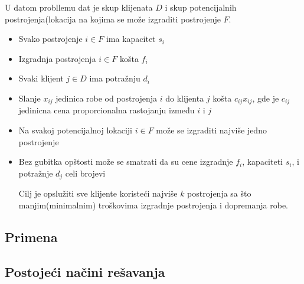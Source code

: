 \documentclass[a4paper]{article}
\begin{document}
U datom probllemu dat je skup klijenata $D$ i skup potencijalnih postrojenja(lokacija na kojima se može izgraditi postrojenje $F$.
\begin{itemize}
\item Svako postrojenje $i \in F$ ima kapacitet $s_i$
\item Izgradnja postrojenja $i \in F$ košta $f_i$
\item Svaki klijent $j \in D$ ima potražnju $d_i$
\item Slanje $x_{ij}$ jedinica robe od postrojenja $i$ do klijenta $j$ košta $c_{ij}x_{ij}$, gde je $c_{ij}$ jedinicna cena proporcionalna rastojanju između $i$ i $j$
\item Na svakoj potencijalnoj lokaciji $i \in F$ može se izgraditi najviše jedno postrojenje
\item Bez gubitka opštosti može se smatrati da su cene izgradnje $f_i$, kapaciteti $s_i$, i potražnje $d_j$ celi brojevi

Cilj je opslužiti sve klijente koristeći najviše $k$ postrojenja sa što manjim(minimalnim) troškovima izgradnje postrojenja i dopremanja robe.
\end{itemize}

\subsection{Primena}

\subsection{Postojeći načini rešavanja}




\appendix
 

\end{document}
